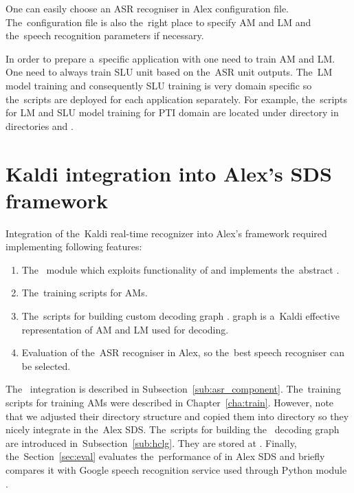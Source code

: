 One can easily choose an \ac{ASR} recogniser in Alex configuration file.
The~configuration file is also the~right place to specify \ac{AM} and \ac{LM} and the~speech recognition parameters if necessary.

In order to prepare a~specific application with  one need to train \ac{AM} and \ac{LM}.
One need to always train \ac{SLU} unit based on the~\ac{ASR} unit outputs.
The~\ac{LM} model training and consequently \ac{SLU} training is very domain specific so the~scripts are deployed for each application separately.
For example, the~scripts for \ac{LM} and \ac{SLU} model training for \ac{PTI} domain are located under directory  in directories  and .

\section[Kaldi integration into \acs{SDS} framework]{Kaldi integration into Alex's \acl{SDS} framework}
\label{sec:asrsds}

Integration of the~Kaldi real-time recognizer into Alex's framework required implementing following features:
\begin{enumerate}
    \item The~ module which exploits functionality of  and implements the~abstract .
    \item The~training scripts for \aclp{AM}.
        \item The~scripts for building custom decoding graph .  graph is a~Kaldi effective representation of \ac{AM} and \ac{LM} used for decoding. 
    \item Evaluation of the~\ac{ASR} recogniser in Alex, so the~best speech recogniser can be selected.
\end{enumerate}

The~ integration is described in Subsection~\ref{sub:asr_component}.
The~training scripts for training \acp{AM} were described in Chapter~\ref{cha:train}.
However, note that we adjusted their directory structure and copied them into  directory so they nicely integrate in the~Alex \ac{SDS}.
The~scripts for building the~ decoding graph are introduced in~Subsection~\ref{sub:hclg}.
They are stored at .
Finally, the~Section~\ref{sec:eval} evaluates the~performance of  in Alex \ac{SDS} and briefly compares it with Google speech recognition service used through Python module .

